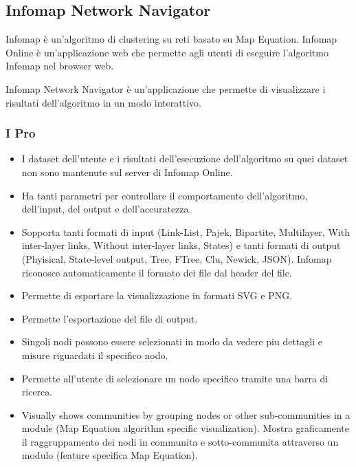 \documentclass[a4paper,12pt]{report}
\begin{document}
		\subsection{Infomap Network Navigator}
		Infomap è un'algoritmo di clustering su reti basato su Map Equation. Infomap Online è un'applicazione web che permette agli utenti di eseguire
		l'algoritmo Infomap nel browser web. \cite{mapequationsite} \par
		
		Infomap Network Navigator è un'applicazione che permette di visualizzare i risultati
		dell'algoritmo in un modo interattivo. \cite{mapequationnavigatorsite} \par

		
			\subsubsection*{I Pro}
				\begin{itemize}
					\item I dataset dell'utente e i risultati dell'esecuzione dell'algoritmo su quei dataset non sono mantenute sul server di Infomap Online.
					\item Ha tanti parametri per controllare il comportamento dell'algoritmo, dell'input, del output e dell'accuratezza.
					\item Sopporta tanti formati di input (Link-List, Pajek, Bipartite, Multilayer, With inter-layer links, Without inter-layer links, States) e tanti formati di output (Phyisical, State-level output, Tree, FTree, Clu, Newick, JSON). Infomap riconosce automaticamente il formato dei file dal header del file.
					\item Permette di esportare la visualizzazione in formati SVG e PNG.
					\item Permette l'esportazione del file di output.
					\item Singoli nodi possono essere selezionati in modo da vedere piu dettagli e misure riguardati il specifico nodo.
					\item Permette all'utente di selezionare un nodo specifico tramite una barra di ricerca.
					\item Visually shows communities by grouping nodes or other sub-communities in a module (Map Equation algorithm specific visualization). Mostra graficamente il raggruppamento dei nodi in communita e sotto-communita attraverso un modulo (feature specifica Map Equation).
				\end{itemize}			
\end{document}
